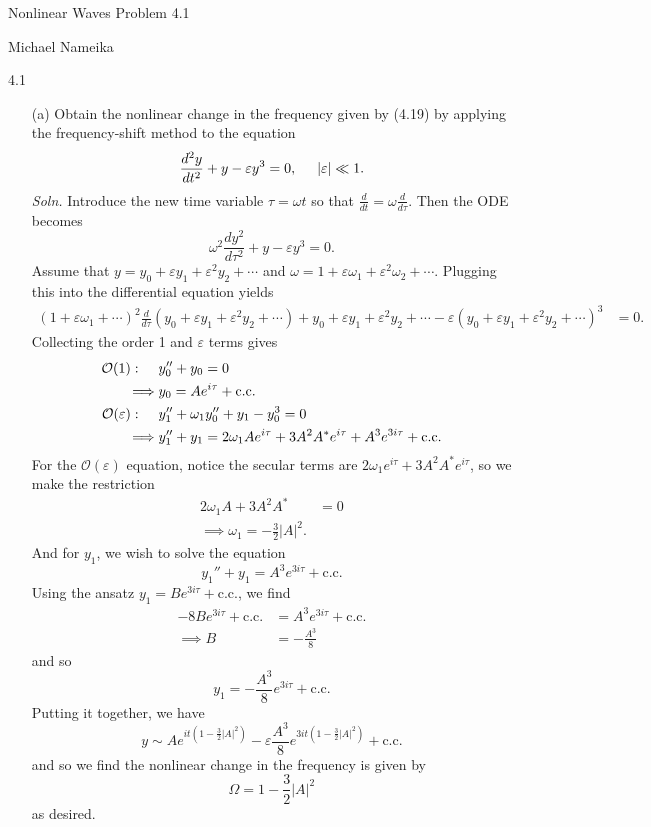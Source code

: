 \documentclass{article}
\begin{document}
\begin{center}
    {\huge Nonlinear Waves Problem 4.1}
    \vspace{0.5cm}

    {\large Michael Nameika}
\end{center}

4.1
\begin{itemize}
    \item[(a)] Obtain the nonlinear change in the frequency given by (4.19) by applying the frequency-shift method to the equation
    \[\frac{d^2y}{dt^2} + y - \varepsilon y^3 = 0, \hspace{0.5cm} |\varepsilon| \ll 1.\]
    \textit{Soln.} Introduce the new time variable $\tau  = \omega t$ so that $\frac{d}{dt} = \omega \frac{d}{d\tau}$. Then the ODE becomes
    \[\omega^2\frac{dy^2}{d\tau^2} + y - \varepsilon y^3 = 0.\]
    Assume that $y = y_0 + \varepsilon y_1 + \varepsilon^2y_2 + \cdots$ and $\omega = 1 + \varepsilon\omega_1 + \varepsilon^2\omega_2 + \cdots$. Plugging this into the differential equation yields
    \begin{align*}
        (1 + \varepsilon \omega_1 + \cdots)^2\frac{d}{d\tau}(y_0 + \varepsilon y_1 + \varepsilon^2y_2 + \cdots) + y_0 + \varepsilon y_1 + \varepsilon^2y_2 + \cdots - \varepsilon(y_0 + \varepsilon y_1 + \varepsilon^2y_2 + \cdots)^3 &= 0.
    \end{align*}
    Collecting the order 1 and $\varepsilon$ terms gives
    \begin{align*}
        \mathcal{O}(1): \hspace{0.5cm} &y_0'' + y_0 = 0\\
        \implies &y_0  = A e^{i\tau} + \text{c.c.}\\
        \mathcal{O}(\varepsilon): \hspace{0.5cm} &y_1'' + \omega_1y_0'' + y_1 - y_0^3 = 0\\
        \implies &y_1'' + y_1 = 2\omega_1Ae^{i\tau} + 3A^2A^*e^{i\tau} + A^3e^{3i\tau} + \text{c.c.}
    \end{align*}
    For the $\mathcal{O}(\varepsilon)$ equation, notice the secular terms are $2\omega_1e^{i\tau} + 3A^2A^*e^{i\tau}$, so we make the restriction
    \begin{align*}
        2\omega_1A + 3A^2A^* &= 0\\
        \implies \omega_1 = -\frac{3}{2}|A|^2.
    \end{align*}
    And for $y_1$, we wish to solve the equation
    \[y_1'' + y_1 = A^3e^{3i\tau} + \text{c.c.}\]
    Using the ansatz $y_1 = Be^{3i\tau} + \text{c.c.}$, we find
    \begin{align*}
        -8Be^{3i\tau} + \text{c.c.} &= A^3e^{3i\tau} + \text{c.c.}\\
        \implies B &= -\frac{A^3}{8}
    \end{align*}
    and so
    \[y_1 = -\frac{A^3}{8}e^{3i\tau} + \text{c.c.}\]
    Putting it together, we have
    \[y \sim Ae^{it\left(1 - \frac{3}{2}|A|^2\right)} - \varepsilon\frac{A^3}{8}e^{3it\left(1 - \frac{3}{2}|A|^2\right)} + \text{c.c.}\]
    and so we find the nonlinear change in the frequency is given by
    \[\Omega = 1 - \frac{3}{2}|A|^2\]
    as desired.


\end{itemize}
\end{document}
